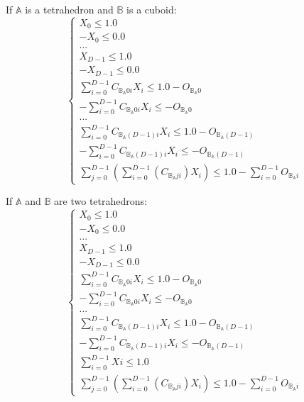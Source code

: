 \documentclass[12pt, a4paper]{article}
\begin{document}
If $\mathbb{A}$ is a tetrahedron and $\mathbb{B}$ is a cuboid:
\begin{equation}
\left\lbrace
\begin{array}{c}
X_0\le1.0\\
-X_0\le0.0\\
...\\
X_{D-1}\le1.0\\
-X_{D-1}\le0.0\\
\sum_{i=0}^{D-1}C_{\mathbb{B}_\mathbb{A}0i}X_i\le1.0-O_{\mathbb{B}_\mathbb{A}0}\\
-\sum_{i=0}^{D-1}C_{\mathbb{B}_\mathbb{A}0i}X_i\le-O_{\mathbb{B}_\mathbb{A}0}\\
...\\
\sum_{i=0}^{D-1}C_{\mathbb{B}_\mathbb{A}(D-1)i}X_i\le1.0-O_{\mathbb{B}_\mathbb{A}(D-1)}\\
-\sum_{i=0}^{D-1}C_{\mathbb{B}_\mathbb{A}(D-1)i}X_i\le-O_{\mathbb{B}_\mathbb{A}(D-1)}\\
\sum_{j=0}^{D-1}\left(\sum_{i=0}^{D-1}\left(C_{\mathbb{B}_\mathbb{A}ji}\right)X_i\right)\le1.0-\sum_{i=0}^{D-1}O_{\mathbb{B}_\mathbb{A}i}
\end{array}
\right.
\end{equation}

If $\mathbb{A}$ and $\mathbb{B}$ are two tetrahedrons:
\begin{equation}
\left\lbrace
\begin{array}{c}
X_0\le1.0\\
-X_0\le0.0\\
...\\
X_{D-1}\le1.0\\
-X_{D-1}\le0.0\\
\sum_{i=0}^{D-1}C_{\mathbb{B}_\mathbb{A}0i}X_i\le1.0-O_{\mathbb{B}_\mathbb{A}0}\\
-\sum_{i=0}^{D-1}C_{\mathbb{B}_\mathbb{A}0i}X_i\le-O_{\mathbb{B}_\mathbb{A}0}\\
...\\
\sum_{i=0}^{D-1}C_{\mathbb{B}_\mathbb{A}(D-1)i}X_i\le1.0-O_{\mathbb{B}_\mathbb{A}(D-1)}\\
-\sum_{i=0}^{D-1}C_{\mathbb{B}_\mathbb{A}(D-1)i}X_i\le-O_{\mathbb{B}_\mathbb{A}(D-1)}\\
\sum_{i=0}^{D-1}Xi\le1.0\\
\sum_{j=0}^{D-1}\left(\sum_{i=0}^{D-1}\left(C_{\mathbb{B}_\mathbb{A}ji}\right)X_i\right)\le1.0-\sum_{i=0}^{D-1}O_{\mathbb{B}_\mathbb{A}i}
\end{array}
\right.
\end{equation}
\end{document}
